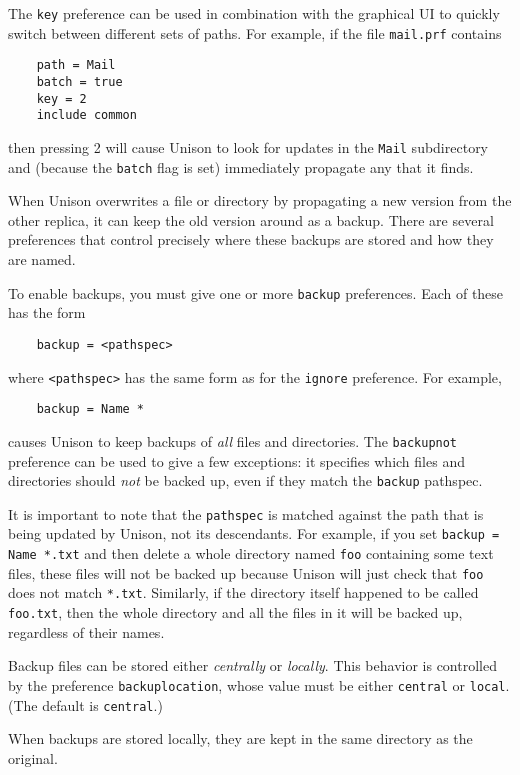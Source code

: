 \documentclass{article}
\begin{document}
The {\tt key} preference can be used in combination with the graphical UI
to quickly switch between different sets of paths.  For example, if the
file {\tt mail.prf} contains
\begin{verbatim}
    path = Mail
    batch = true
    key = 2
    include common
\end{verbatim}
then pressing 2 will cause Unison to look for updates in the {\tt Mail}
subdirectory and (because the {\tt batch} flag is set) immediately
propagate any that it finds.



When Unison overwrites a file or directory by propagating a new version from
the other replica, it can keep the old version around as a backup.  There
are several preferences that control precisely where these backups are
stored and how they are named.

To enable backups, you must give one or more \verb|backup| preferences.
Each of these has the form
\begin{verbatim}
    backup = <pathspec>
\end{verbatim}
where \verb|<pathspec>| has the same form as for the \verb|ignore|
preference.  For example, 
\begin{verbatim}
    backup = Name *
\end{verbatim}
causes Unison to keep backups of {\em all} files and directories.  The
\verb|backupnot| preference can be used to give a few exceptions: it
specifies which files and directories should {\em not} be backed up, even if
they match the \verb|backup| pathspec. 

It is important to note that the \verb|pathspec| is matched against the path
that is being updated by Unison, not its descendants.  For example, if you
set \verb|backup = Name *.txt| and then delete a whole directory named
\verb|foo| containing some text files, these files will not be backed up
because Unison will just check that \verb|foo| does not match \verb|*.txt|.
Similarly, if the directory itself happened to be called \verb|foo.txt|,
then the whole directory and all the files in it will be backed up,
regardless of their names. 

Backup files can be stored either {\em centrally} or {\em locally}.  This
behavior is controlled by the preference \verb|backuplocation|, whose value
must be either \verb|central| or \verb|local|.  (The default is
\verb|central|.)  

When backups are stored locally, they are kept in the same
directory as the original.
\end{document}
